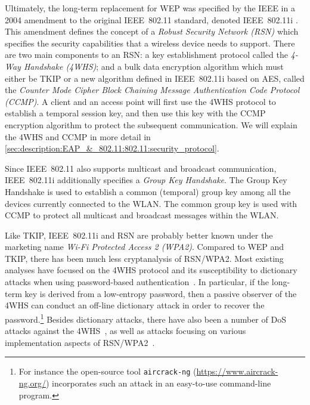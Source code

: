 Ultimately,
the long-term replacement for WEP was specified by the IEEE in a 2004 amendment to the original IEEE~802.11 standard,
denoted IEEE~802.11i \cite{IEEE:2004:802.11i}.
This amendment defines the concept of a \emph{Robust Security Network (RSN)}
which specifies the security capabilities that a wireless device needs to support.
There are two main components to an RSN: 
a key establishment protocol called the \emph{4-Way Handshake (4WHS)};
and a bulk data encryption algorithm which must either be TKIP or a new algorithm defined in IEEE~802.11i based on AES,
called the  \emph{Counter Mode Cipher Block Chaining Message Authentication Code Protocol (CCMP)}.
A client and an access point will first use the 4WHS protocol to establish a temporal session key,
and then use this key with the CCMP encryption algorithm to protect the subsequent communication.
We will explain the 4WHS and CCMP in more detail in \cref{sec:description:EAP_&_802.11:802.11:security_protocol}.




Since IEEE~802.11 also supports multicast and broadcast communication,
IEEE~802.11i additionally specifies a \emph{Group Key Handshake}.
The Group Key Handshake is used to establish a common (temporal) group key among all the devices currently connected  to the WLAN.
The common group key is used with CCMP to protect all multicast and broadcast messages within the WLAN.

Like TKIP,
IEEE~802.11i and RSN are probably better known under the marketing name
\emph{Wi-Fi Protected Access 2 (WPA2)}.
Compared to WEP and TKIP,
there has been much less cryptanalysis of RSN/WPA2.
Most existing analyses have focused on the 4WHS protocol and its susceptibility to dictionary attacks when using password-based authentication~\cite{JohnsonRJZ:2015:WPA/WPA2_FGPA_brute_force,CHES:KMBKK16}.
In particular,
if the long-term key is derived from a low-entropy password,
then a passive observer of the 4WHS can conduct an off-line dictionary attack in order to recover the password.\footnote{For instance the 
open-source tool \texttt{aircrack-ng} (\url{https://www.aircrack-ng.org/}) incorporates such an attack in an easy-to-use command-line program. 
} 
Besides dictionary attacks,
there have also been a number of DoS attacks against the 4WHS~\cite{HeM:2004:analysis_4WHS,NDSS:HeMit05,RangoLM:2006:DoS_802.11,ACNS:Eian09,CANS:Eian10,EianM:2012:802.11_deadlock},
as well as attacks focusing on various implementation aspects of RSN/WPA2~\cite{NDSS:CRKN13,VanhoefP:2016:WPA2_GTK_attack}.

